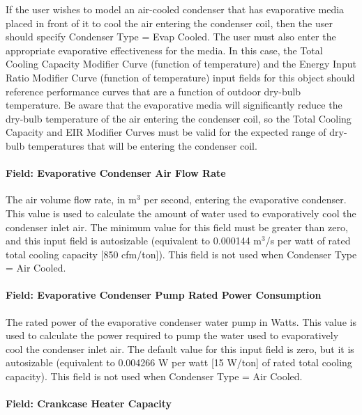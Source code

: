 If the user wishes to model an air-cooled condenser that has evaporative media placed in front of it to cool the air entering the condenser coil, then the user should specify Condenser Type = Evap Cooled. The user must also enter the appropriate evaporative effectiveness for the media. In this case, the Total Cooling Capacity Modifier Curve (function of temperature) and the Energy Input Ratio Modifier Curve (function of temperature) input fields for this object should reference performance curves that are a function of outdoor dry-bulb temperature. Be aware that the evaporative media will significantly reduce the dry-bulb temperature of the air entering the condenser coil, so the Total Cooling Capacity and EIR Modifier Curves must be valid for the expected range of dry-bulb temperatures that will be entering the condenser coil.

\paragraph{Field: Evaporative Condenser Air Flow Rate}\label{field-evaporative-condenser-air-flow-rate}

The air volume flow rate, in m\(^{3}\) per second, entering the evaporative condenser. This value is used to calculate the amount of water used to evaporatively cool the condenser inlet air. The minimum value for this field must be greater than zero, and this input field is autosizable (equivalent to 0.000144 m\(^{3}\)/s per watt of rated total cooling capacity {[}850 cfm/ton{]}). This field is not used when Condenser Type = Air Cooled.

\paragraph{Field: Evaporative Condenser Pump Rated Power Consumption}\label{field-evaporative-condenser-pump-rated-power-consumption}

The rated power of the evaporative condenser water pump in Watts. This value is used to calculate the power required to pump the water used to evaporatively cool the condenser inlet air. The default value for this input field is zero, but it is autosizable (equivalent to 0.004266 W per watt {[}15 W/ton{]} of rated total cooling capacity). This field is not used when Condenser Type = Air Cooled.

\paragraph{Field: Crankcase Heater Capacity}\label{field-crankcase-heater-capacity}

